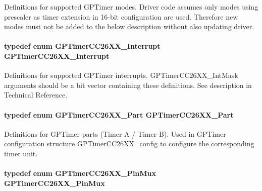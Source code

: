 Definitions for supported G\+P\+Timer modes. Driver code assumes only modes using prescaler as timer extension in 16-\/bit configuration are used. Therefore new modes must not be added to the below description without also updating driver. 

\paragraph[{G\+P\+Timer\+C\+C26\+X\+X\+\_\+\+Interrupt}]{\setlength{\rightskip}{0pt plus 5cm}typedef enum {\bf G\+P\+Timer\+C\+C26\+X\+X\+\_\+\+Interrupt}  {\bf G\+P\+Timer\+C\+C26\+X\+X\+\_\+\+Interrupt}}\label{_g_p_timer_c_c26_x_x_8h_aa4cc2366361f3ae2d3438d4496e6b184}


Definitions for supported G\+P\+Timer interrupts. G\+P\+Timer\+C\+C26\+X\+X\+\_\+\+Int\+Mask arguments should be a bit vector containing these definitions. See description in Technical Reference. 

\paragraph[{G\+P\+Timer\+C\+C26\+X\+X\+\_\+\+Part}]{\setlength{\rightskip}{0pt plus 5cm}typedef enum {\bf G\+P\+Timer\+C\+C26\+X\+X\+\_\+\+Part}  {\bf G\+P\+Timer\+C\+C26\+X\+X\+\_\+\+Part}}\label{_g_p_timer_c_c26_x_x_8h_a7067a38f9de14af167de8df90dfb18d3}


Definitions for G\+P\+Timer parts (Timer A / Timer B). Used in G\+P\+Timer configuration structure G\+P\+Timer\+C\+C26\+X\+X\+\_\+config to configure the corresponding timer unit. 

\paragraph[{G\+P\+Timer\+C\+C26\+X\+X\+\_\+\+Pin\+Mux}]{\setlength{\rightskip}{0pt plus 5cm}typedef enum {\bf G\+P\+Timer\+C\+C26\+X\+X\+\_\+\+Pin\+Mux}  {\bf G\+P\+Timer\+C\+C26\+X\+X\+\_\+\+Pin\+Mux}}\label{_g_p_timer_c_c26_x_x_8h_a02bcd903a770b3bc9bea666cf5b0bded}


